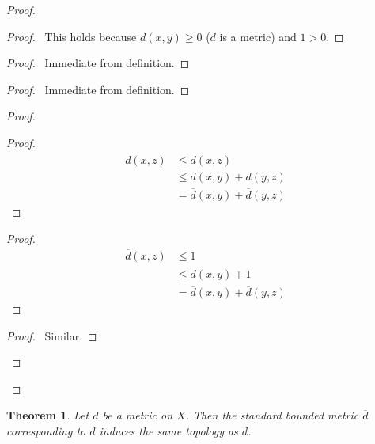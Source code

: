 \documentclass{report}
\let\qed\relax
\newtheorem{thm}[lm]{Theorem}
\theoremstyle{definition}
\begin{document}
  \begin{proof}
    \pf
    \begin{proof}
      \pf\ This holds because $d(x, y) \geq 0$ ($d$ is a metric) and $1 > 0$.
    \end{proof}
    \begin{proof}
      \pf\ Immediate from definition.
    \end{proof}
    \begin{proof}
      \pf\ Immediate from definition.
    \end{proof}
    \begin{proof}
      \begin{proof}
        \pf
        \begin{align*}
          \overline{d}(x, z) & \leq d(x, z) \\
          & \leq d(x, y) + d(y, z) \\
          & = \overline{d}(x, y) + \overline{d}(y, z)
        \end{align*}
      \end{proof}
      \begin{proof}
        \pf
        \begin{align*}
          \overline{d}(x, z) & \leq 1 \\
          & \leq \overline{d}(x, y) + 1 \\
          & = \overline{d}(x, y) + \overline{d}(y, z)
        \end{align*}
      \end{proof}
      \begin{proof}
        \pf\ Similar.
      \end{proof}
    \end{proof}
    \qed
  \end{proof}

  \begin{thm}
    Let $d$ be a metric on $X$. Then the standard bounded metric $\overline{d}$
    corresponding to $d$ induces the same topology as $d$.
  \end{thm}
\end{document}
